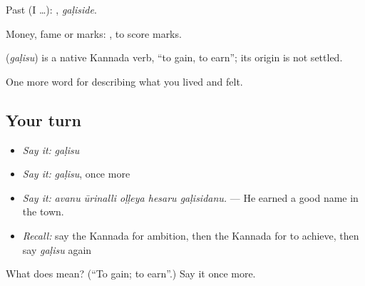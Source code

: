 Past (I …): , \emph{gaḷiside}.

Money, fame or marks:  , to score marks.

\begin{cousinweb}
\textbf{} (\emph{gaḷisu}) is a native Kannada verb, \textquotedblleft{}to gain, to earn\textquotedblright{}; its origin is not settled.
\end{cousinweb}

\begin{grammarlens}[title={What you've built}]
One more word for describing what you lived and felt.
\end{grammarlens}

\subsection*{Your turn}
\begin{itemize}
\raggedright
  \item \emph{Say it:} \emph{gaḷisu}
  \item \emph{Say it:} \emph{gaḷisu}, once more
  \item \emph{Say it:} \emph{avanu ūrinalli oḷḷeya hesaru gaḷisidanu.} — He earned a good name in the town.
  \item \emph{Recall:} say the Kannada for ambition, then the Kannada for to achieve, then say \emph{gaḷisu} again
\end{itemize}

\begin{tcolorbox}[breakable,colback=teal!4,colframe=teal!35!black,title={Before you move on}]
What does  mean? (\textquotedblleft{}To gain; to earn\textquotedblright{}.) Say it once more.
\end{tcolorbox}
